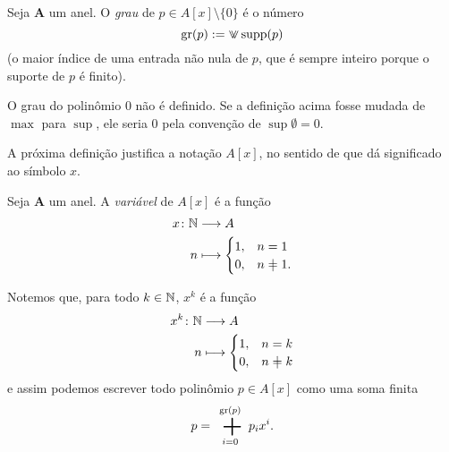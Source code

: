 \begin{definition}
Seja $\bm A$ um anel. O \emph{grau} de $p \in A[x] \setminus \{0\}$ é o número
	\begin{equation*}
	\g(p) := \max{\supp(p)}
	\end{equation*}
(o maior índice de uma entrada não nula de $p$, que é sempre inteiro porque o suporte de $p$ é finito).
\end{definition}

O grau do polinômio $0$ não é definido. Se a definição acima fosse mudada de $\max$ para $\sup$, ele seria $0$ pela convenção de $\sup \emptyset = 0$.

A próxima definição justifica a notação $A[x]$, no sentido de que dá significado ao símbolo $x$.

\begin{definition}
Seja $\bm A$ um anel. A \emph{variável} de $A[x]$ é a função
	\begin{align*}
	\func{x}{\N}{A}{n}{\begin{cases}
		1,& n=1 \\
		0,& n\neq 1.
	\end{cases}}
	\end{align*}
\end{definition}

Notemos que, para todo $k \in \mathbb{N}$, $x^k$ é a função
	\begin{align*}
	\func{x^k}{\N}{A}{n}{\begin{cases}
		1,& n=k \\
		0,& n \neq k
	\end{cases}}
	\end{align*}
e assim podemos escrever todo polinômio $p \in A[x]$ como uma soma finita
	\begin{equation*}
	p = \sum_{i=0}^{\g(p)} p_ix^i.
	\end{equation*}


